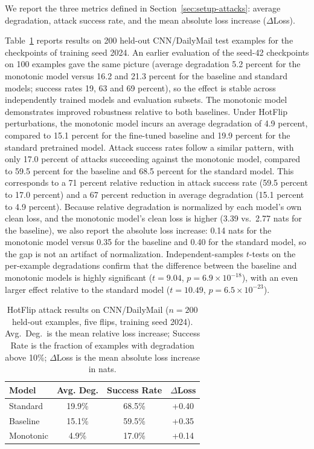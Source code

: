 \documentclass{article}
\theoremstyle{plain}
\theoremstyle{definition}
\theoremstyle{remark}
\begin{document}
We report the three metrics defined in Section~\ref{sec:setup-attacks}: average degradation, attack success rate, and the mean absolute loss increase ($\Delta$Loss).


Table~\ref{tab:hotflip} reports results on 200 held-out CNN/DailyMail test examples for the checkpoints of training seed 2024. An earlier evaluation of the seed-42 checkpoints on 100 examples gave the same picture (average degradation 5.2 percent for the monotonic model versus 16.2 and 21.3 percent for the baseline and standard models; success rates 19, 63 and 69 percent), so the effect is stable across independently trained models and evaluation subsets. The monotonic model demonstrates improved robustness relative to both baselines. Under HotFlip perturbations, the monotonic model incurs an average degradation of 4.9 percent, compared to 15.1 percent for the fine-tuned baseline and 19.9 percent for the standard pretrained model. Attack success rates follow a similar pattern, with only 17.0 percent of attacks succeeding against the monotonic model, compared to 59.5 percent for the baseline and 68.5 percent for the standard model. This corresponds to a 71 percent relative reduction in attack success rate (59.5 percent to 17.0 percent) and a 67 percent reduction in average degradation (15.1 percent to 4.9 percent). Because relative degradation is normalized by each model's own clean loss, and the monotonic model's clean loss is higher (3.39 vs.\ 2.77 nats for the baseline), we also report the absolute loss increase: 0.14 nats for the monotonic model versus 0.35 for the baseline and 0.40 for the standard model, so the gap is not an artifact of normalization. %
Independent-samples $t$-tests on the per-example degradations confirm that the difference between the baseline and monotonic models is highly significant ($t {= }9.04$, $p = 6.9 {\times} 10^{-18}$), with an even larger effect relative to the standard model ($t {=} 10.49$, $p {=} 6.5{ \times} 10^{-23}$).



\begin{table}[t]
\caption{HotFlip attack results on CNN/DailyMail ($n = 200$ held-out examples, five flips, training seed 2024). Avg.\ Deg.\ is the mean relative loss increase; Success Rate is the fraction of examples with degradation above 10\%; $\Delta$Loss is the mean absolute loss increase in nats.}
\label{tab:hotflip}
\vskip 0.1in
\begin{center}
\begin{small}
\begin{tabular}{lccc}
\toprule
Model & Avg. Deg. & Success Rate & $\Delta$Loss \\
\midrule
Standard  & 19.9\% & 68.5\% & +0.40 \\
Baseline  & 15.1\% & 59.5\% & +0.35 \\
Monotonic &  4.9\% & 17.0\% & +0.14 \\
\bottomrule
\end{tabular}
\end{small}
\end{center}
\vskip -0.1in
\end{table}
\end{document}
